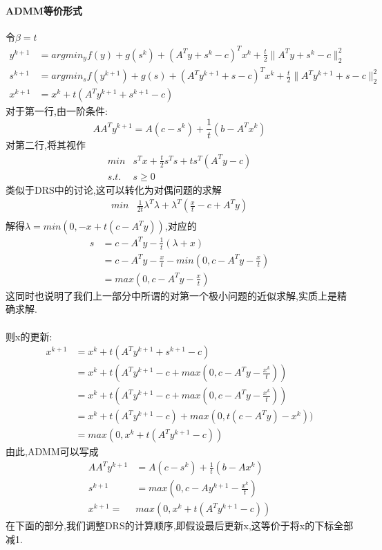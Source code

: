 \documentclass[UTF8]{ctexart}
\begin{document}
\paragraph{ADMM等价形式}
令$\beta = t$
\begin{equation}
  \begin{split}
     y^{k+1} & =argmin_y f(y)+g(s^k)+(A^Ty+s^k-c)^Tx^k+\frac{t}{2}\|A^Ty+s^k-c \|_2^2 \\
      s^{k+1} & =argmin_s f(y^{k+1})+ g(s)+(A^Ty^{k+1}+s-c)^Tx^k+\frac{t}{2}\|A^Ty^{k+1}+s-c \|_2^2 \\
       x^{k+1}&= x^k+t(A^Ty^{k+1}+s^{k+1}-c)
  \end{split}
\end{equation}
对于第一行,由一阶条件:
$$
AA^Ty^{k+1} = A(c-s^k)+\frac{1}{t}(b-A^Tx^k)
$$
对第二行,将其视作
\begin{align*}
  min &  s^Tx+\frac{t}{2}s^Ts+ts^T(A^Ty-c)\\
  s.t. & s\geq 0
\end{align*}
类似于DRS中的讨论,这可以转化为对偶问题的求解
\begin{align*}
  min &  \frac{1}{2t}\lambda^T\lambda + \lambda^T(\frac{x}{t}-c+A^Ty)\\
\end{align*}
解得$\lambda=min(0,-x+t(c-A^Ty))$,对应的
\begin{align*}
  s & =c-A^Ty-\frac{1}{t}(\lambda+x) \\
   & =c-A^Ty-\frac{x}{t}-min(0,c-A^Ty-\frac{x}{t})\\
   & =max(0,c-A^Ty-\frac{x}{t})
\end{align*}
这同时也说明了我们上一部分中所谓的对第一个极小问题的近似求解,实质上是精确求解.
\paragraph{}
则x的更新:
\begin{align*}
  x^{k+1} & = x^k+t(A^Ty^{k+1}+s^{k+1}-c) \\
   & =x^k+t(A^Ty^{k+1}-c+max(0,c-A^Ty-\frac{x^k}{t}))\\
   & =x^k+t(A^Ty^{k+1}-c+max(0,c-A^Ty-\frac{x^k}{t})) \\
   & =x^k+t(A^Ty^{k+1}-c)+max(0,t(c-A^Ty)-x^k)) \\
   & =max(0,x^k+t(A^Ty^{k+1}-c))
\end{align*}
由此,ADMM可以写成
\begin{equation}
  \begin{split}
     AA^Ty^{k+1}& = A(c-s^k)+\frac{1}{t}(b-Ax^k) \\
      s^{k+1} & =max(0,c-Ay^{k+1}-\frac{x^k}{t}) \\
       x^{k+1}=& max(0,x^k+t(A^Ty^{k+1}-c))
  \end{split}
\end{equation}
在下面的部分,我们调整DRS的计算顺序,即假设最后更新x,这等价于将x的下标全部减1.
\end{document}
